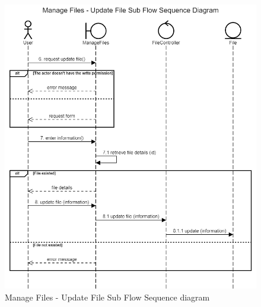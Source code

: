 \begin{figure}[H]
    \centering
    \includegraphics[width=1.0\textwidth]{images/Manage Files - Update File Sub Flow Sequence Diagram.png}
    \caption{Manage Files - Update File Sub Flow Sequence diagram}
    \label{fig:SeqFilesUpdate}
\end{figure}
